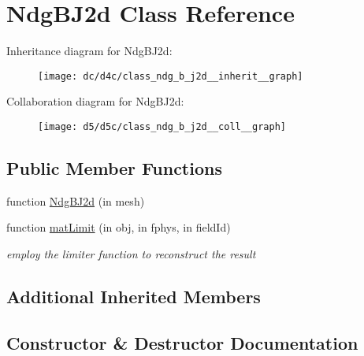 \hypertarget{class_ndg_b_j2d}{}\section{Ndg\+B\+J2d Class Reference}
\label{class_ndg_b_j2d}


Inheritance diagram for Ndg\+B\+J2d\+:
\nopagebreak
\begin{figure}[H]
\begin{center}
\leavevmode
\texttt{[image: dc/d4c/class\_ndg\_b\_j2d\_\_inherit\_\_graph]}
\end{center}
\end{figure}


Collaboration diagram for Ndg\+B\+J2d\+:
\nopagebreak
\begin{figure}[H]
\begin{center}
\leavevmode
\texttt{[image: d5/d5c/class\_ndg\_b\_j2d\_\_coll\_\_graph]}
\end{center}
\end{figure}
\subsection*{Public Member Functions}
\begin{DoxyCompactItemize}
\item 
function \hyperlink{class_ndg_b_j2d_aab2ae16fa4d909b3b844089a102f4b8b}{Ndg\+B\+J2d} (in mesh)
\item 
function \hyperlink{class_ndg_b_j2d_a9483f2ee7676a72c59325d0c50005ec3}{mat\+Limit} (in obj, in fphys, in field\+Id)
\begin{DoxyCompactList}\small\item\em employ the limiter function to reconstruct the result \end{DoxyCompactList}\end{DoxyCompactItemize}
\subsection*{Additional Inherited Members}


\subsection{Constructor \& Destructor Documentation}
\mbox{\label{class_ndg_b_j2d_aab2ae16fa4d909b3b844089a102f4b8b}} 

